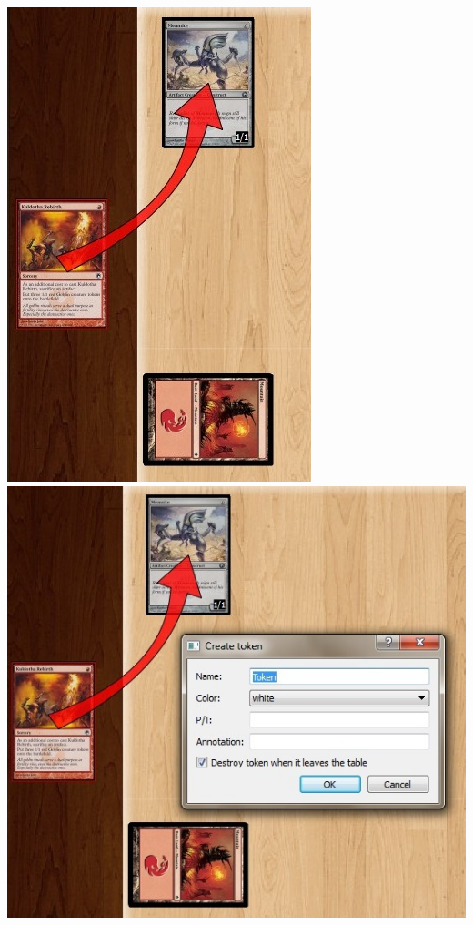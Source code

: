 \documentclass[a4paper]{scrbook}
\begin{document}
\begin{center}
\includegraphics[scale=0.5]{pics/fetch2c36} \\
\includegraphics[scale=0.5]{pics/fetch9bff} \\

\end{center}
\end{document}
